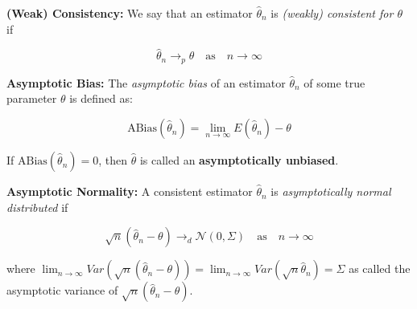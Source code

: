 \documentclass[
  letterpaper,
  DIV=11,
  numbers=noendperiod]{scrreprt}
\theoremstyle{definition}
\theoremstyle{plain}
\theoremstyle{plain}
\theoremstyle{remark}
\begin{document}
\textbf{(Weak) Consistency:} We say that an estimator \(\hat\theta_n\)
is \emph{(weakly) consistent for \(\theta\)} if

\[\hat\theta_n\to_{p}\theta\quad\text{as}\quad n\to\infty\]

\textbf{Asymptotic Bias:} The \emph{asymptotic bias} of an estimator
\(\hat\theta_n\) of some true parameter \(\theta\) is defined as:

\[\text{ABias}(\hat\theta_n)=\lim_{n\to\infty}E(\hat\theta_n)-\theta\]

If \(\text{ABias}(\hat\theta_n)=0\), then \(\hat\theta\) is called an
\textbf{asymptotically unbiased}.

\textbf{Asymptotic Normality:} A consistent estimator \(\hat\theta_n\)
is \emph{asymptotically normal distributed} if

\[\sqrt{n}(\hat\theta_n-\theta)\to_{d} \mathcal{N}(0,\Sigma)\quad\text{as}\quad n\to\infty\]

where
\(\lim_{n\to\infty}Var(\sqrt{n}(\hat\theta_n-\theta))=\lim_{n\to\infty}Var(\sqrt{n}\hat\theta_n)=\Sigma\)
as called the asymptotic variance of \(\sqrt{n}(\hat\theta_n-\theta)\).
\end{document}
